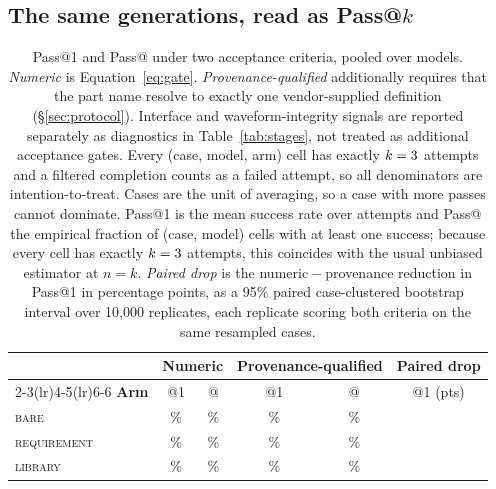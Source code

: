\subsection{The same generations, read as Pass@\texorpdfstring{$k$}{k}}
\label{sec:passk}

\begin{table}[tb]
\centering
\caption{Pass@1 and Pass@\SamplesPerCell{} under two acceptance criteria,
  pooled over models. \emph{Numeric} is Equation~\ref{eq:gate}.
  \emph{Provenance-qualified} additionally requires that the part name
  resolve to exactly one vendor-supplied definition
  (\S\ref{sec:protocol}). Interface and waveform-integrity signals are
  reported separately as diagnostics in Table~\ref{tab:stages}, not treated
  as additional acceptance gates. Every
  (case, model, arm) cell has exactly $k=3{}$ attempts and a
  filtered completion counts as a failed attempt, so all denominators are
  intention-to-treat. Cases are the unit of averaging, so a case with more
  passes cannot dominate. Pass@1 is the mean success rate over attempts and
  Pass@\SamplesPerCell{} the empirical fraction of (case, model) cells with at
  least one success; because every cell has exactly $k=3{}$
  attempts, this coincides with the usual unbiased estimator at $n=k$.
  \emph{Paired drop} is the numeric${}-{}$provenance reduction in Pass@1 in
  percentage points, as a 95\% paired case-clustered bootstrap interval over
  10{,}000 replicates, each replicate scoring both criteria on the same
  resampled cases.}
\label{tab:passk}
\small
\begin{tabular}{@{}lccccc@{}}
\toprule
& \multicolumn{2}{c}{\textbf{Numeric}}
& \multicolumn{2}{c}{\textbf{Provenance-qualified}}
& \textbf{Paired drop} \\
\cmidrule(lr){2-3}\cmidrule(lr){4-5}\cmidrule(lr){6-6}
\textbf{Arm} & @1 & @\SamplesPerCell{} & @1 & @\SamplesPerCell{}
  & @1 (pts) \\
\midrule
\textsc{bare}        & \PassOneBareNumeric{}\% & \PassKBareNumeric{}\%
                     & \PassOneBareProv{}\%    & \PassKBareProv{}\%
                     & \PairedDropBareOne{} \\
\textsc{requirement} & \PassOneReqNumeric{}\%  & \PassKReqNumeric{}\%
                     & \PassOneReqProv{}\%     & \PassKReqProv{}\%
                     & \PairedDropReqOne{} \\
\textsc{library}     & \PassOneLibNumeric{}\%  & \PassKLibNumeric{}\%
                     & \PassOneLibProv{}\%     & \PassKLibProv{}\%
                     & \PairedDropLibOne{} \\
\bottomrule
\end{tabular}
\end{table}

